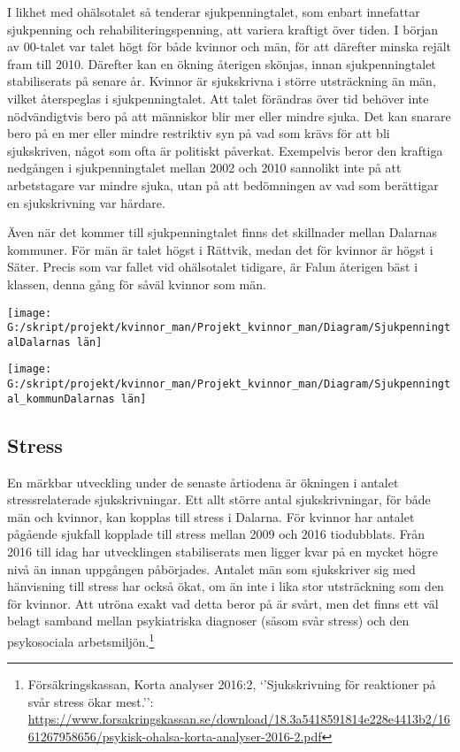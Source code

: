 \documentclass[
]{article}
\begin{document}
I likhet med ohälsotalet så tenderar sjukpenningtalet, som enbart
innefattar sjukpenning och rehabiliteringspenning, att variera kraftigt
över tiden. I början av 00-talet var talet högt för både kvinnor och
män, för att därefter minska rejält fram till 2010. Därefter kan en
ökning återigen skönjas, innan sjukpenningtalet stabiliserats på senare
år. Kvinnor är sjukskrivna i större utsträckning än män, vilket
återspeglas i sjukpenningtalet. Att talet förändras över tid behöver
inte nödvändigtvis bero på att människor blir mer eller mindre sjuka.
Det kan snarare bero på en mer eller mindre restriktiv syn på vad som
krävs för att bli sjukskriven, något som ofta är politiskt påverkat.
Exempelvis beror den kraftiga nedgången i sjukpenningtalet mellan 2002
och 2010 sannolikt inte på att arbetstagare var mindre sjuka, utan på
att bedömningen av vad som berättigar en sjukskrivning var hårdare.

Även när det kommer till sjukpenningtalet finns det skillnader mellan
Dalarnas kommuner. För män är talet högst i Rättvik, medan det för
kvinnor är högst i Säter. Precis som var fallet vid ohälsotalet
tidigare, är Falun återigen bäst i klassen, denna gång för såväl kvinnor
som män.

\begin{center}\texttt{[image: G:/skript/projekt/kvinnor\_man/Projekt\_kvinnor\_man/Diagram/SjukpenningtalDalarnas län]} \end{center}

\begin{center}\texttt{[image: G:/skript/projekt/kvinnor\_man/Projekt\_kvinnor\_man/Diagram/Sjukpenningtal\_kommunDalarnas län]} \end{center}

\hypertarget{stress}{%
\subsection{Stress}\label{stress}}

En märkbar utveckling under de senaste årtiodena är ökningen i antalet
stressrelaterade sjukskrivningar. Ett allt större antal sjukskrivningar,
för både män och kvinnor, kan kopplas till stress i Dalarna. För kvinnor
har antalet pågående sjukfall kopplade till stress mellan 2009 och 2016
tiodubblats. Från 2016 till idag har utvecklingen stabiliserats men
ligger kvar på en mycket högre nivå än innan uppgången påbörjades.
Antalet män som sjukskriver sig med hänvisning till stress har också
ökat, om än inte i lika stor utsträckning som den för kvinnor. Att
utröna exakt vad detta beror på är svårt, men det finns ett väl belagt
samband mellan psykiatriska diagnoser (såsom svår stress) och den
psykosociala arbetsmiljön.\footnote{Försäkringskassan, Korta analyser
  2016:2, `'Sjukskrivning för reaktioner på svår stress ökar mest.'':
  \url{https://www.forsakringskassan.se/download/18.3a5418591814e228e4413b2/1661267958656/psykisk-ohalsa-korta-analyser-2016-2.pdf}}
\end{document}
